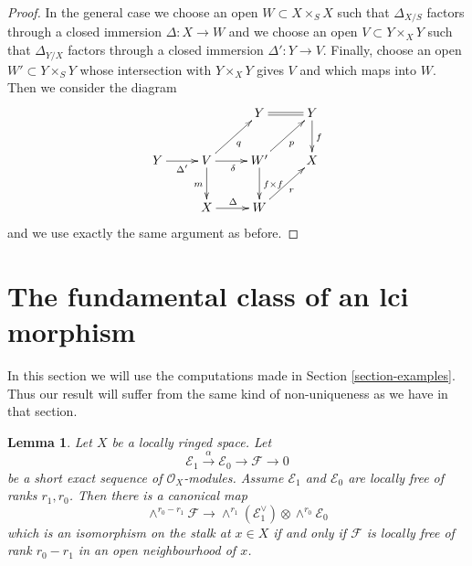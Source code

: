 \documentclass{stacks-project}
\theoremstyle{plain}
\newtheorem{lemma}[subsection]{Lemma}
\theoremstyle{definition}
\theoremstyle{remark}
\numberwithin{equation}{subsection}
\begin{document}
\begin{proof}
\medskip\noindent
In the general case we choose an open $W \subset X \times_S X$
such that $\Delta_{X/S}$ factors through a closed immersion
$\Delta : X \to W$ and we choose an open $V \subset Y \times_X Y$
such that $\Delta_{Y/X}$ factors through a closed immersion
$\Delta' : Y \to V$. Finally, choose an open
$W' \subset Y \times_S Y$ whose intersection with $Y \times_X Y$
gives $V$ and which maps into $W$. Then we consider the diagram
$$
\xymatrix{
& & Y \ar@{=}[r] & Y \ar[d]^f \\
Y \ar[r]_{\Delta'} &
V \ar[d]_m \ar[r]_\delta \ar[ru]_q &
W' \ar[d]^{f \times f} \ar[ru]_p & X\\
& X \ar[r]^\Delta & W \ar[ru]_r
}
$$
and we use exactly the same argument as before.
\end{proof}






\section{The fundamental class of an lci morphism}
\label{section-fundamental-class}

\noindent
In this section we will use the computations made in
Section \ref{section-examples}. Thus our result will suffer
from the same kind of non-uniqueness as we have in that section.

\begin{lemma}
\label{lemma-determinant}
Let $X$ be a locally ringed space. Let
$$
\mathcal{E}_1 \xrightarrow{\alpha} \mathcal{E}_0 \to \mathcal{F} \to 0
$$
be a short exact sequence of $\mathcal{O}_X$-modules.
Assume $\mathcal{E}_1$ and $\mathcal{E}_0$ are locally
free of ranks $r_1, r_0$. Then there is a canonical map
$$
\wedge^{r_0 - r_1}\mathcal{F}
\longrightarrow
\wedge^{r_1}(\mathcal{E}_1^\vee) \otimes \wedge^{r_0}\mathcal{E}_0
$$
which is an isomorphism on the stalk at $x \in X$
if and only if $\mathcal{F}$ is locally free of rank $r_0 - r_1$
in an open neighbourhood of $x$.
\end{lemma}
\end{document}
